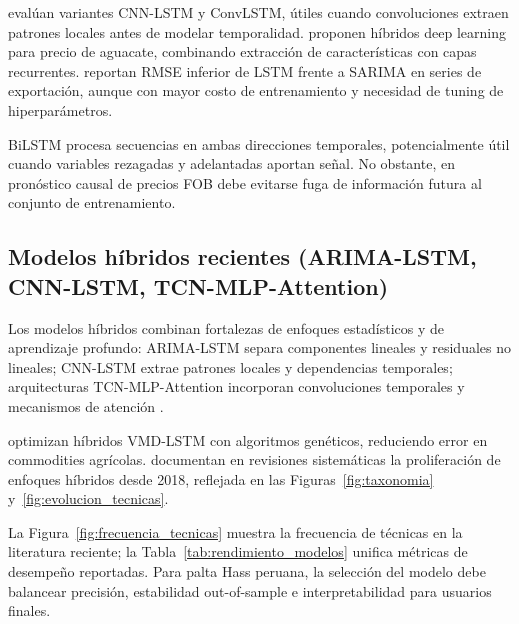 \citet{Murugesan2022} eval\'uan variantes CNN-LSTM y ConvLSTM, \'utiles cuando convoluciones extraen patrones locales antes de modelar temporalidad. \citet{Zhang2025} proponen h\'ibridos deep learning para precio de aguacate, combinando extracci\'on de caracter\'isticas con capas recurrentes. \citet{Kurnadipare2025} reportan RMSE inferior de LSTM frente a SARIMA en series de exportaci\'on, aunque con mayor costo de entrenamiento y necesidad de tuning de hiperpar\'ametros.

BiLSTM procesa secuencias en ambas direcciones temporales, potencialmente \'util cuando variables rezagadas y adelantadas aportan se\~nal. No obstante, en pron\'ostico causal de precios FOB debe evitarse fuga de informaci\'on futura al conjunto de entrenamiento.

\subsection{Modelos h\'ibridos recientes (ARIMA-LSTM, CNN-LSTM, TCN-MLP-Attention)}

Los modelos h\'ibridos combinan fortalezas de enfoques estad\'isticos y de aprendizaje profundo: ARIMA-LSTM separa componentes lineales y residuales no lineales; CNN-LSTM extrae patrones locales y dependencias temporales; arquitecturas TCN-MLP-Attention incorporan convoluciones temporales y mecanismos de atenci\'on \citep{Chen2023, Zhang2025, Murugesan2022}.

\citet{Chen2023} optimizan h\'ibridos VMD-LSTM con algoritmos gen\'eticos, reduciendo error en commodities agr\'icolas. \citet{Theofilou2025} documentan en revisiones sistem\'aticas la proliferaci\'on de enfoques h\'ibridos desde 2018, reflejada en las Figuras~\ref{fig:taxonomia} y~\ref{fig:evolucion_tecnicas}.



La Figura~\ref{fig:frecuencia_tecnicas} muestra la frecuencia de t\'ecnicas en la literatura reciente; la Tabla~\ref{tab:rendimiento_modelos} unifica m\'etricas de desempe\~no reportadas. Para palta Hass peruana, la selecci\'on del modelo debe balancear precisi\'on, estabilidad out-of-sample e interpretabilidad para usuarios finales.


